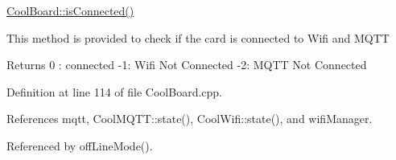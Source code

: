 \hyperlink{classCoolBoard_ad7442cf4b62c7b0d5bd62a0f75ffc065}{Cool\+Board\+::is\+Connected()}

This method is provided to check if the card is connected to Wifi and M\+Q\+TT

\begin{DoxyReturn}{Returns}
0 \+: connected -\/1\+: Wifi Not Connected -\/2\+: M\+Q\+TT Not Connected 
\end{DoxyReturn}


Definition at line 114 of file Cool\+Board.\+cpp.



References mqtt, Cool\+M\+Q\+T\+T\+::state(), Cool\+Wifi\+::state(), and wifi\+Manager.



Referenced by off\+Line\+Mode().


